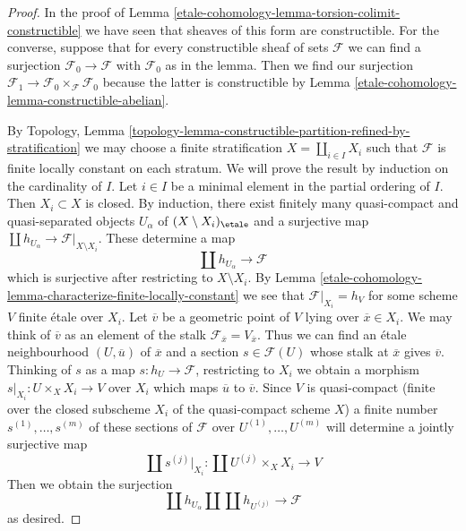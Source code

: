 \begin{proof}
In the proof of Lemma \ref{etale-cohomology-lemma-torsion-colimit-constructible}
we have seen that sheaves of this form are constructible.
For the converse, suppose that for every constructible sheaf of
sets $\mathcal{F}$ we can find a surjection $\mathcal{F}_0 \to \mathcal{F}$
with $\mathcal{F}_0$ as in the lemma. Then we find our surjection
$\mathcal{F}_1 \to \mathcal{F}_0 \times_\mathcal{F} \mathcal{F}_0$
because the latter is constructible by Lemma \ref{etale-cohomology-lemma-constructible-abelian}.

\medskip\noindent
By Topology, Lemma
\ref{topology-lemma-constructible-partition-refined-by-stratification}
we may choose a finite stratification
$X = \coprod_{i \in I} X_i$ such that $\mathcal{F}$ is finite locally
constant on each stratum. We will prove the result by induction on
the cardinality of $I$. Let $i \in I$ be a minimal element in the
partial ordering of $I$. Then $X_i \subset X$ is closed.
By induction, there exist finitely many quasi-compact and quasi-separated
objects $U_\alpha$ of $(X \setminus X_i)_\etale$ and a surjective
map $\coprod h_{U_\alpha} \to \mathcal{F}|_{X \setminus X_i}$.
These determine a map
$$
\coprod h_{U_\alpha} \to \mathcal{F}
$$
which is surjective after restricting to $X \setminus X_i$. By
Lemma \ref{etale-cohomology-lemma-characterize-finite-locally-constant}
we see that $\mathcal{F}|_{X_i} = h_V$ for some scheme $V$ finite \'etale
over $X_i$. Let $\overline{v}$ be a geometric point of $V$ lying
over $\overline{x} \in X_i$. We may think of $\overline{v}$ as an
element of the stalk $\mathcal{F}_{\overline{x}} = V_{\overline{x}}$.
Thus we can find an \'etale neighbourhood $(U, \overline{u})$
of $\overline{x}$ and a section $s \in \mathcal{F}(U)$ whose stalk at
$\overline{x}$ gives $\overline{v}$. Thinking of $s$ as a map
$s : h_U \to \mathcal{F}$, restricting to $X_i$ we obtain a morphism
$s|_{X_i} : U \times_X X_i \to V$ over $X_i$ which maps $\overline{u}$
to $\overline{v}$. Since $V$ is quasi-compact (finite over the closed
subscheme $X_i$ of the quasi-compact scheme $X$) a finite number
$s^{(1)}, \ldots, s^{(m)}$ of these sections of $\mathcal{F}$ over
$U^{(1)}, \ldots, U^{(m)}$ will determine a jointly
surjective map
$$
\coprod s^{(j)}|_{X_i} : \coprod U^{(j)} \times_X X_i \longrightarrow V
$$
Then we obtain the surjection
$$
\coprod h_{U_\alpha} \amalg \coprod h_{U^{(j)}} \to \mathcal{F}
$$
as desired.
\end{proof}

